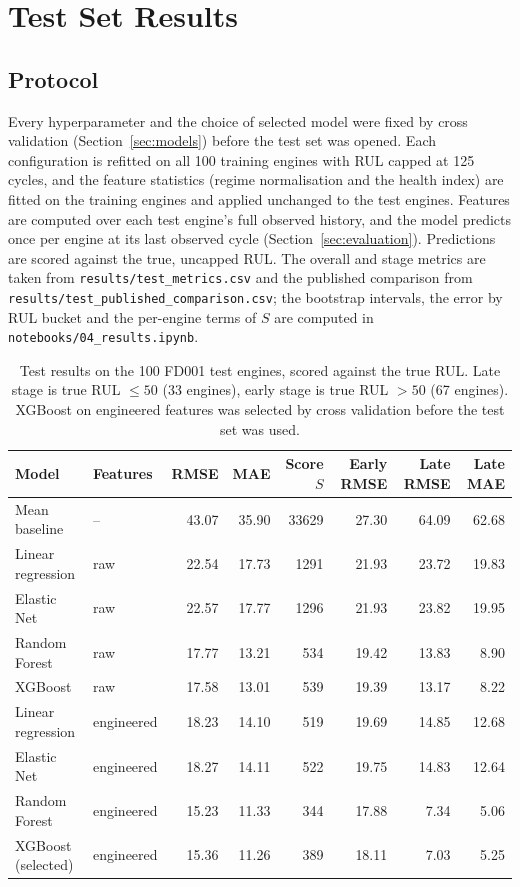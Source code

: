 \section{Test Set Results}
\label{sec:results}

\subsection{Protocol}
Every hyperparameter and the choice of selected model were fixed by cross
validation (Section~\ref{sec:models}) before the test set was opened. Each
configuration is refitted on all 100 training engines with RUL capped at
125 cycles, and the feature statistics (regime normalisation and the health
index) are fitted on the training engines and applied unchanged to the test
engines. Features are computed over each test engine's full observed
history, and the model predicts once per engine at its last observed cycle
(Section~\ref{sec:evaluation}). Predictions are scored against the true,
uncapped RUL. The overall and stage metrics are taken from
\texttt{results/test\_metrics.csv} and the published comparison from
\texttt{results/test\_published\_comparison.csv}; the bootstrap intervals,
the error by RUL bucket and the per-engine terms of $S$ are computed in \texttt{notebooks/04\_results.ipynb}.

\begin{table}[t]
\centering
\caption{Test results on the 100 FD001 test engines, scored against the
true RUL. Late stage is true RUL $\le 50$ (33 engines), early stage is
true RUL $> 50$ (67 engines). XGBoost on engineered features was selected
by cross validation before the test set was used.}
\label{tab:test-results}
\begin{tabular}{llrrrrrr}
\hline
Model & Features & RMSE & MAE & Score $S$ & Early RMSE & Late RMSE & Late MAE \\
\hline
Mean baseline     & --         & 43.07 & 35.90 & 33629 & 27.30 & 64.09 & 62.68 \\
Linear regression & raw        & 22.54 & 17.73 & 1291  & 21.93 & 23.72 & 19.83 \\
Elastic Net       & raw        & 22.57 & 17.77 & 1296  & 21.93 & 23.82 & 19.95 \\
Random Forest     & raw        & 17.77 & 13.21 & 534   & 19.42 & 13.83 & 8.90 \\
XGBoost           & raw        & 17.58 & 13.01 & 539   & 19.39 & 13.17 & 8.22 \\
Linear regression & engineered & 18.23 & 14.10 & 519   & 19.69 & 14.85 & 12.68 \\
Elastic Net       & engineered & 18.27 & 14.11 & 522   & 19.75 & 14.83 & 12.64 \\
Random Forest     & engineered & 15.23 & 11.33 & 344   & 17.88 & 7.34  & 5.06 \\
XGBoost (selected) & engineered & 15.36 & 11.26 & 389  & 18.11 & 7.03  & 5.25 \\
\hline
\end{tabular}
\end{table}

